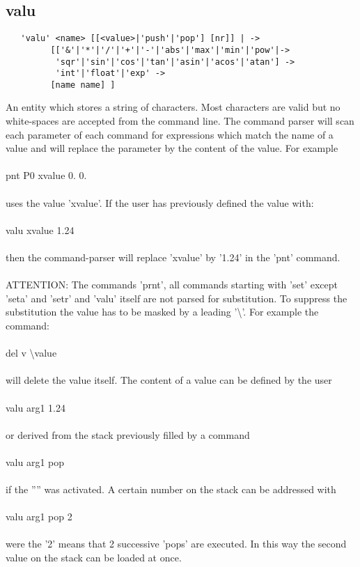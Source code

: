 \documentclass{article}
\begin{document}
\subsection{\label{valu}valu}
\begin{verbatim}
   'valu' <name> [[<value>|'push'|'pop'] [nr]] | ->
         [['&'|'*'|'/'|'+'|'-'|'abs'|'max'|'min'|'pow'|->
          'sqr'|'sin'|'cos'|'tan'|'asin'|'acos'|'atan'] ->
          'int'|'float'|'exp' ->
         [name name] ]
\end{verbatim}
An entity which stores a string of characters. Most characters are valid but no white-spaces are accepted from the command line.
The command parser will scan each parameter of each command for expressions which match the name of a value and will replace the parameter by the content of the value. For example\\\\pnt P0 xvalue 0. 0.\\\\uses the value 'xvalue'. If the user has previously defined the value with:\\\\valu xvalue 1.24\\\\then the command-parser will replace 'xvalue' by '1.24' in the 'pnt' command.
\\\\ATTENTION: The commands 'prnt', all commands starting with 'set' except 'seta' and 'setr' and 'valu' itself are not parsed for substitution. To suppress the substitution the value has to be masked by a leading '\textbackslash{}'. For example the command:\\\\del v \textbackslash{}value\\\\will delete the value itself. The content of a value can be defined by the user\\\\valu arg1 1.24\\\\or derived from the stack previously filled by a command\\\\valu arg1 pop\\\\if the '''' was activated. A certain number on the stack can be addressed with\\\\valu arg1 pop 2\\\\were the '2' means that 2 successive 'pops' are executed. In this way the second value on the stack can be loaded at once.
\end{document}
